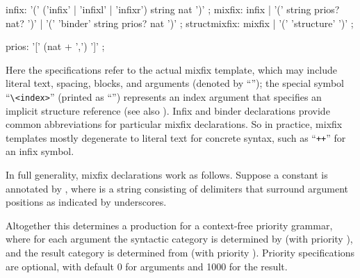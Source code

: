 \begin{isabellebody}
\begin{isamarkuptext}
  \begin{rail}
    infix: '(' ('infix' | 'infixl' | 'infixr') string nat ')'
    ;
    mixfix: infix | '(' string prios? nat? ')' | '(' 'binder' string prios? nat ')'
    ;
    structmixfix: mixfix | '(' 'structure' ')'
    ;

    prios: '[' (nat + ',') ']'
    ;
  \end{rail}

  Here the  specifications refer to the actual mixfix
  template, which may include literal text, spacing, blocks, and
  arguments (denoted by ``\isa{{\isacharunderscore}}''); the special symbol
  ``\verb|\<index>|'' (printed as ``\isa{{\isachardoublequote}{\isasymindex}{\isachardoublequote}}'') represents an index
  argument that specifies an implicit structure reference (see also
  ).  Infix and binder declarations provide common
  abbreviations for particular mixfix declarations.  So in practice,
  mixfix templates mostly degenerate to literal text for concrete
  syntax, such as ``\verb|++|'' for an infix symbol.

  \medskip In full generality, mixfix declarations work as follows.
  Suppose a constant  is
  annotated by , where  is a string  consisting of
  delimiters that surround argument positions as indicated by
  underscores.

  Altogether this determines a production for a context-free priority
  grammar, where for each argument  the syntactic category
  is determined by  (with priority ), and
  the result category is determined from \isa{{\isachardoublequote}{\isasymtau}{\isachardoublequote}} (with
  priority ).  Priority specifications are optional, with
  default 0 for arguments and 1000 for the result.


\end{isamarkuptext}
\end{isabellebody}
